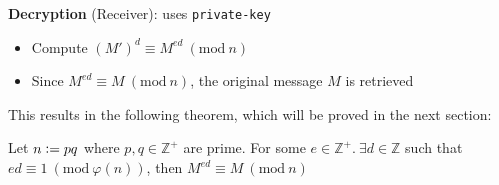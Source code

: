 \textbf{Decryption} (Receiver): uses \texttt{private-key}
\begin{itemize}
\item Compute $(M')^{d} \equiv M^{ed}~(\text{mod}~n)$
\item Since $M^{ed} \equiv M~(\text{mod}~n)$, the original message $M$ is retrieved
\end{itemize}
This results in the following theorem, which will be proved in the next section:
\begin{theorem}[RSA]
\label{RSA_thrm}
Let $n \vcentcolon= pq$ where $p,q \in \mathbb{Z}^{+}$ are prime. For some $e \in \mathbb{Z}^{+}.~\exists d \in \mathbb{Z}$ such that $ed \equiv 1~(\text{mod}~\varphi(n))$, then $M^{ed} \equiv M~(\text{mod}~n)$
\end{theorem}
